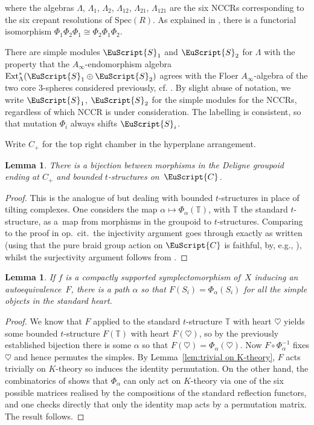 \documentclass[10pt,a4paper]{amsart}
\newcommand{\Spec}{\mathrm{Spec}}
\newcommand{\scrC}{\EuScript{C}}
\def\bT{\mathbb{T}}
\def\A{A}
\def\scrS{\EuScript{S}}
\newtheorem{lem}[thm]{Lemma}
\theoremstyle{definition}
\numberwithin{equation}{section}
\begin{document}
where the algebras $\Lambda$, $\Lambda_{1}$, $\Lambda_{2}$, $\Lambda_{12}$, $\Lambda_{21}$, $\Lambda_{121}$ are the six NCCRs corresponding to the six crepant resolutions of $\Spec (R)$.
 As explained in \cite[Remark~4.7]{Hirano-Wemyss}, there is a functorial isomorphism $\Phi_1\Phi_2\Phi_1\cong\Phi_2\Phi_1\Phi_2$.

 There are simple modules $\scrS_1$ and $\scrS_2$ for $\Lambda$ with the property that the $\A_{\infty}$-endomorphism algebra $\mathrm{Ext}_{\Lambda}^*(\scrS_1 \oplus \scrS_2)$ agrees with the Floer $A_{\infty}$-algebra of the two core 3-spheres considered previously, cf. \cite[Proposition~3.11]{Smith-Wemyss}.
 By slight abuse of notation, we write $\scrS_1$, $\scrS_2$ for the simple modules for the NCCRs, regardless of which NCCR is under consideration. The labelling is consistent, so that mutation $\Phi_i$ always shifts $\scrS_i$.

Write $C_+$ for the top right chamber in the hyperplane arrangement.

\begin{lem} \label{lem:path bijection}
There is a bijection between morphisms in the Deligne groupoid ending at $C_+$ and bounded $t$-structures on~$\scrC$.
\end{lem}

\begin{proof} This is the analogue of \cite[Corollary 5.3]{August-Wemyss} but dealing with bounded $t$-structures in place of tilting complexes. One considers the map $\alpha \mapsto \Phi_{\alpha}(\bT)$, with $\bT$ the standard $t$-structure, as a~map from morphisms in the groupoid to $t$-structures. Comparing to the proof in op.~cit.\ the injectivity argument goes through exactly as written (using that the pure braid group action on $\scrC$ is faithful, by, e.g., \cite[Corollary~5.5]{August-Wemyss}), whilst the surjectivity argument follows from \cite[Theorem~4.6]{Hara-Wemyss}.
\end{proof}


\begin{lem}\label{lem:same on simples}
If $f$ is a compactly supported symplectomorphism of~$X$ inducing an autoequivalence~$F$, there is a path $\alpha$ so that $F(S_i) = \Phi_{\alpha}(S_i)$ for all the simple objects in the standard heart.
\end{lem}

\begin{proof} We know that $F$ applied to the standard $t$-structure $\bT$ with heart $\heartsuit$ yields some bounded $t$-structure $F(\bT)$ with heart $F(\heartsuit)$, so by the previously established bijection there is some $\alpha$ so that $F(\heartsuit) = \Phi_{\alpha}(\heartsuit)$. Now $F \circ \Phi_{\alpha}^{-1}$ fixes $\heartsuit$ and hence permutes the simples. By Lemma~\ref{lem:trivial on K-theory}, $F$ acts trivially on $K$-theory so induces the identity permutation. On the other hand, the combinatorics of \cite[Proposition 4.8]{Hirano-Wemyss} shows that $\Phi_{\alpha}$ can only act on $K$-theory via one of the six possible matrices realised by the compositions of the standard reflection functors, and one checks directly that only the identity map acts by a permutation matrix. The result follows. \end{proof}
\end{document}
